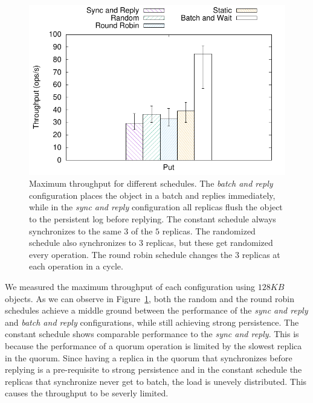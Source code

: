 \begin{figure}[t]
    \centering
    \includegraphics[width=.75\linewidth]{r2s2_results/rr_small/tput.pdf}
    \caption{Maximum throughput for different schedules.
    The \emph{batch and reply} configuration places the
    object in a batch and replies immediately, while in the \emph{sync and reply} configuration all replicas
    flush the object to the persistent log before replying. The
    constant schedule always synchronizes to the same $3$ of the
    $5$ replicas. The randomized schedule also synchronizes to
    $3$ replicas, but these get randomized every operation. The
    round robin schedule changes the $3$ replicas at each
    operation in a cycle.}\label{fig:r2s2_sched}
\end{figure}

We measured the maximum throughput of each configuration using  $128KB$ objects.
As we can observe in Figure~\ref{fig:r2s2_sched}, both the random
and the round robin schedules achieve a middle ground between the
performance of the \emph{sync and reply} and \emph{batch and
reply} configurations, while still achieving strong persistence.
The constant schedule shows comparable performance to the
\emph{sync and reply}. This is because the performance of a
quorum operation is limited by the slowest replica in the quorum.
Since having a replica in the quorum that synchronizes before replying is a
pre-requisite to strong persistence and in the constant schedule
the replicas that synchronize never get to batch, the load is
unevely distributed. This causes the throughput to be severly
limited.

